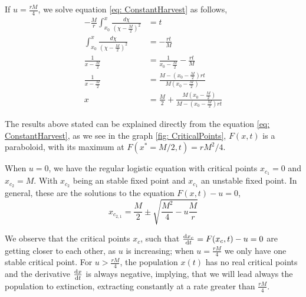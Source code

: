 If $u=\frac{rM}{4}$, we solve equation \ref{eq: ConstantHarvest} as follows,
\begin{align}
-\frac{M}{r}\int_{x_0}^{x}\frac{d\chi}{\left(\chi-\frac{M}{2}\right)^2}&=t\\
\int_{x_0}^{x}\frac{d\chi}{\left(\chi-\frac{M}{2}\right)^2}&=-\frac{rt}{M}\\
\frac{1}{x-\frac{M}{2}}&=\frac{1}{x_0-\frac{M}{2}}-\frac{rt}{M}\\
\frac{1}{x-\frac{M}{2}}&=\frac{M-\left(x_0-\frac{M}{2}\right)rt}{M\left(x_0-\frac{M}{2}\right)} \\
x&=\frac{M}{2}+\frac{M\left(x_0-\frac{M}{2}\right)}{M-\left(x_0-\frac{M}{2}\right)rt} 
\end{align}

The results above stated can be explained directly from the equation \ref{eq: ConstantHarvest}, as we see in the graph \ref{fig: CriticalPoints},  $F(x,t)$ is a paraboloid, with its maximum at $F(x^*=M/2,t)=rM^2/4$.

When $u=0$, we have the regular logistic equation with critical points $x_{c_1}=0$ and $x_{c_2}=M$. With $x_{c_2}$ being an stable fixed point and $x_{c_1}$ an unstable fixed point. In general, these are the solutions to the equation $F(x,t)-u=0$,
\begin{equation}
x_{c_{2,1}}=\frac{M}{2}\pm \sqrt{\frac{M^2}{4}-u\frac{M}{r}}
\end{equation}

We observe that the critical points $x_c$, such that $\frac{\mathrm{d} x_c}{{\mathrm{d} t}}=F(x_c, t)-u=0$ are getting closer to each other, as $u$ is increasing; when $u=\frac{rM}{4}$ we only have one stable critical point. For $u> \frac{rM}{4}$, the population $x(t)$ has no real critical points and the derivative $\frac{\mathrm{d} x}{{\mathrm{d} t}}$ is always negative, implying, that we will lead always the population to extinction, extracting constantly at a rate greater than $\frac{rM}{4}$.

